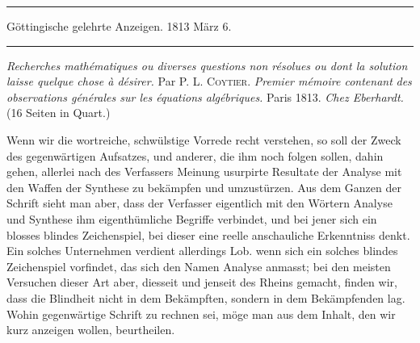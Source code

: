 \clearpage
{}
\begin{center}
\par\noindent\hfill\rule{0.30\linewidth}{0.4pt}\hfill\mbox{}\par
Göttingische gelehrte Anzeigen. 1813 März 6.
\par\noindent\hfill\rule{0.30\linewidth}{0.4pt}\hfill\mbox{}\par
\end{center}

\textit{Recherches mathématiques ou diverses questions non résolues ou dont la solution} \textit{laisse quelque chose à désirer.} Par P. L. \textsc{Coytier.} \textit{Premier mémoire contenant} \textit{des observations générales sur les équations algébriques.} Paris 1813. \textit{Chez Eberhardt.} (16 Seiten in Quart.)\par

Wenn wir die wortreiche, schwülstige Vorrede recht verstehen, so soll der Zweck des gegenwärtigen Aufsatzes, und anderer, die ihm noch folgen sollen, dahin gehen, allerlei nach des Verfassers Meinung usurpirte Resultate der Analyse mit den Waffen der Synthese zu bekämpfen und umzustürzen. Aus dem Ganzen der Schrift sieht man aber, dass der Verfasser eigentlich mit den Wörtern Analyse und Synthese ihm eigenthümliche Begriffe verbindet, und bei jener sich ein blosses blindes Zeichenspiel, bei dieser eine reelle anschauliche Erkenntniss denkt. Ein solches Unternehmen verdient allerdings Lob. wenn sich ein solches blindes Zeichenspiel vorfindet, das sich den Namen Analyse anmasst; bei den meisten Versuchen dieser Art aber, diesseit und jenseit des Rheins gemacht, finden wir, dass die Blindheit nicht in dem Bekämpften, sondern in dem Bekämpfenden lag. Wohin gegenwärtige Schrift zu rechnen sei, möge man aus dem Inhalt, den wir kurz anzeigen wollen, beurtheilen.\par


